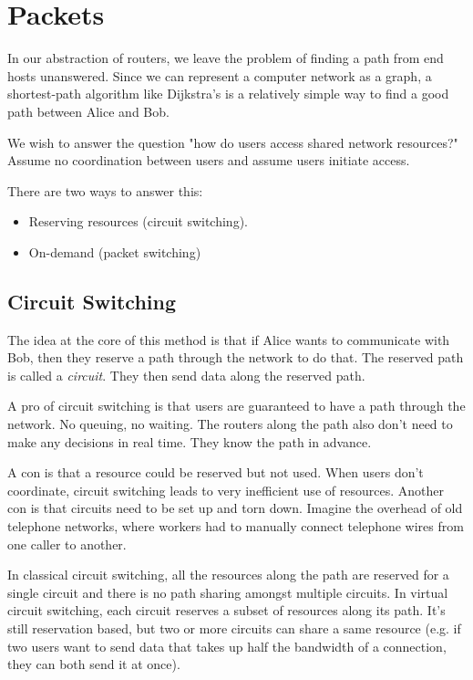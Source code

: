 \section{Packets}
In our abstraction of routers, we leave the problem of finding
a path from end hosts unanswered. Since we can represent a computer
network as a graph, a shortest-path algorithm like Dijkstra's is a
relatively simple way to find a good path between Alice and Bob.

We wish to answer the question "how do users access shared network
resources?" Assume no coordination between users and assume users
initiate access.

There are two ways to answer this:
\begin{itemize}
    \item Reserving resources (circuit switching).
    \item On-demand (packet switching)
\end{itemize}

\subsection{Circuit Switching}
The idea at the core of this method is that if Alice wants to communicate
with Bob, then they reserve a path through the network to do that. The
reserved path is called a \emph{circuit}. They then send data along the
reserved path.

A pro of circuit switching is that users are guaranteed to have a path
through the network. No queuing, no waiting. The routers along the path
also don't need to make any decisions in real time. They know the path
in advance.

A con is that a resource could be reserved but not used. When users don't
coordinate, circuit switching leads to very inefficient use of resources.
Another con is that circuits need to be set up and torn down. Imagine the
overhead of old telephone networks, where workers had to manually connect
telephone wires from one caller to another.

In classical circuit switching, all the resources along the path are reserved
for a single circuit and there is no path sharing amongst multiple circuits.
In virtual circuit switching, each circuit reserves a subset of resources
along its path. It's still reservation based, but two or more circuits can share
a same resource (e.g. if two users want to send data that takes up half the
bandwidth of a connection, they can both send it at once).


